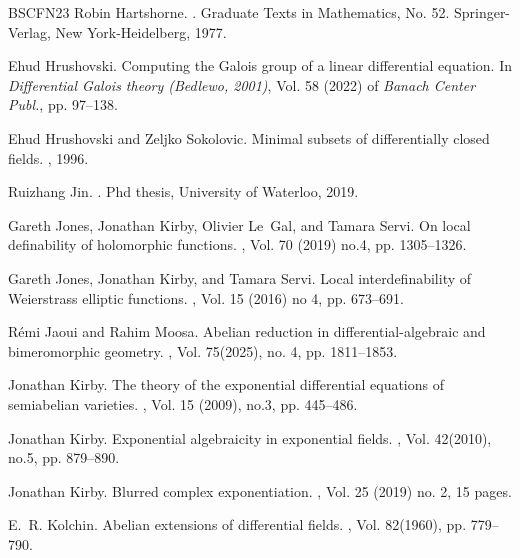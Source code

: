 \documentclass[12pt]{amsart}
\theoremstyle{definition}
\theoremstyle{plain}
\theoremstyle{exampstyle}\newtheorem{thmx}{Theorem}
\theoremstyle{exampstyle}\newtheorem{thmxbis}{Theorem}
\begin{document}
\begin{thebibliography}{BSCFN23}
Robin Hartshorne.
.
\newblock Graduate Texts in Mathematics, No. 52. Springer-Verlag, New
  York-Heidelberg, 1977.

Ehud Hrushovski.
\newblock Computing the {G}alois group of a linear differential equation.
\newblock In {\em Differential {G}alois theory ({B}edlewo, 2001)}, Vol. 58 (2022) of
  {\em Banach Center Publ.}, pp. 97--138. 

Ehud Hrushovski and Zeljko Sokolovic.
\newblock Minimal subsets of differentially closed fields.
, 1996.

Ruizhang Jin.
.
\newblock Phd thesis, University of Waterloo, 2019.

Gareth Jones, Jonathan Kirby, Olivier Le~Gal, and Tamara Servi.
\newblock On local definability of holomorphic functions.
, Vol. 70 (2019) no.4, pp. 1305--1326.

Gareth Jones, Jonathan Kirby, and Tamara Servi.
\newblock Local interdefinability of {W}eierstrass elliptic functions.
, Vol. 15 (2016) no 4, pp. 673--691.

R\'{e}mi Jaoui and Rahim Moosa.
\newblock Abelian reduction in differential-algebraic and bimeromorphic
  geometry.
, Vol. 75(2025), no. 4, pp. 1811--1853.

Jonathan Kirby.
\newblock The theory of the exponential differential equations of semiabelian
  varieties.
, Vol. 15 (2009), no.3, pp. 445--486.

Jonathan Kirby.
\newblock Exponential algebraicity in exponential fields.
, Vol. 42(2010), no.5, pp. 879--890.

Jonathan Kirby.
\newblock Blurred complex exponentiation.
, Vol. 25 (2019) no. 2, 15 pages.

E.~R. Kolchin.
\newblock Abelian extensions of differential fields.
, Vol. 82(1960), pp. 779--790.


\end{thebibliography}
\end{document}
